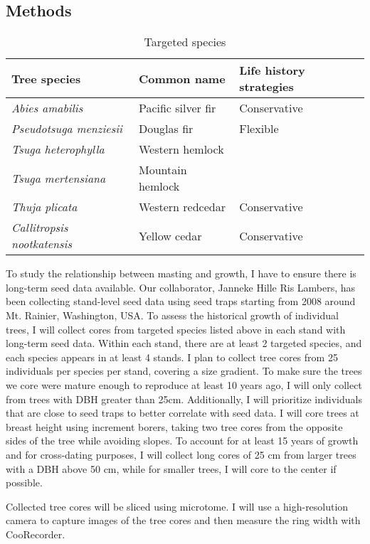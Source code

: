\documentclass[11pt,letter]{article}
\begin{document}
\subsection{Methods}
\begin{table}[htb]
	\centering
	\small
	\caption{Targeted species}
\begin{tabular}{|p{5cm}|p{5cm}|p{5cm}|}
\hline
 Tree species & Common name & Life history strategies\\ \hline %
\textit{Abies amabilis} & Pacific silver fir & Conservative \\ \hline
\textit{Pseudotsuga menziesii} & Douglas fir & Flexible    \\\hline
\textit{Tsuga heterophylla} & Western hemlock &     \\\hline
\textit{Tsuga mertensiana} & Mountain hemlock &     \\\hline
\textit{Thuja plicata} & Western redcedar & Conservative    \\\hline
\textit{Callitropsis nootkatensis} & Yellow cedar & Conservative    \\\hline
\end{tabular}
\end{table}
To study the relationship between masting and growth, I have to ensure there is long-term seed data available. Our collaborator, Janneke Hille Ris Lambers, has been collecting stand-level seed data using seed traps starting from 2008 around Mt. Rainier, Washington, USA. To assess the historical growth of individual trees, I will collect cores from targeted species listed above in each stand with long-term seed data. Within each stand, there are at least 2 targeted species, and each species appears in at least 4 stands. I plan to collect tree cores from 25 individuals per species per stand, covering a size gradient. To make sure the trees we core were mature enough to reproduce at least 10 years ago, I will only collect from trees with DBH greater than 25cm. Additionally, I will prioritize individuals that are close to seed traps to better correlate with seed data. I will core trees at breast height using increment borers, taking two tree cores from the opposite sides of the tree while avoiding slopes. To account for at least 15 years of growth and for cross-dating purposes, I will collect long cores of 25 cm from larger trees with a DBH above 50 cm, while for smaller trees, I will core to the center if possible.

Collected tree cores will be sliced using microtome. I  will use a high-resolution camera to capture images of the tree cores and then measure the ring width with CooRecorder.
\end{document}
